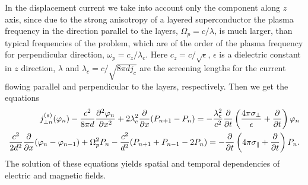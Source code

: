%
%
In the displacement current we take into account only the component along
$z$ axis, since due to the strong anisotropy of a layered superconductor the
plasma frequency in the direction parallel to the layers, $\Omega_p =c/
\lambda$, is much larger, than typical frequencies of the problem, which
are of the order of the plasma frequency for perpendicular direction,
$\omega_p= c_z/\lambda_c$. Here $c_z =c/\sqrt{\epsilon}$, $\epsilon$ is a
dielectric constant in $z$ direction, $\lambda$ and $\lambda_c =c/
\sqrt{8\pi d j_c}$ are the screening lengths for the current flowing
parallel and perpendicular to the layers, respectively. Then we get the
equations
\begin{eqnarray}
j^{(s)}_{\perp n}(\varphi_n)-
\frac{c^2}{8\pi d}
%
%
\frac{\partial^2\varphi_n}{\partial x^2} +
2\lambda_c^2\frac{\partial}{\partial x} (P_{n+1} - P_n) =
-\frac{\lambda_c^2}{c^2}
\frac{\partial}{\partial t}
\left(
  \frac{            %
    4\pi            %
    \sigma_{\perp}  %
   }                %
   {
     \epsilon
   }+
  \frac{\partial}{\partial t}
\right)
\varphi_n
\\ %
\frac{c^2}{2d^2}
\frac{\partial}{\partial x}
(\varphi_n -\varphi_{n-1}) +\Omega_p^2 P_n -
  \frac{c^2}{d^2}(P_{n+1}+P_{n-1}-2P_n
)=
-\frac{\partial}{\partial t}
\left(4\pi \sigma_{\|} +
  \frac{\partial}{\partial t}
\right) P_n.
\end{eqnarray}
%
%
The solution of these equations yields spatial and temporal dependencies of
electric and magnetic fields.


